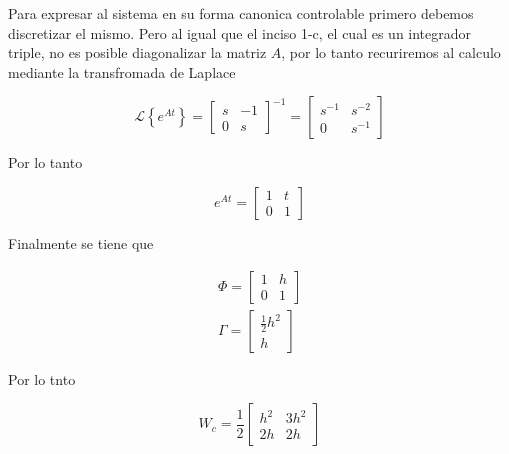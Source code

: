 \documentclass{article}
\newcommand{\laplaceTransform}[1]{\mathcal{L}\left\{ #1 \right\}}
\begin{document}
        Para expresar al sistema en su forma canonica controlable primero debemos discretizar el mismo. Pero
        al igual que el inciso 1-c, el cual es un integrador triple, no es posible diagonalizar la matriz $A$, por lo tanto recuriremos al calculo mediante la transfromada de Laplace 

        \begin{equation}
            \laplaceTransform{e^{At}} = 
                \begin{bmatrix}
                    s & -1 \\ 
                    0 & s 
                \end{bmatrix}^{-1}=
                \begin{bmatrix}
                    s^{-1} & s^{-2} \\ 
                    0 & s^{-1}
                \end{bmatrix}
        \end{equation} 

        Por lo tanto 

        \begin{equation}
            e^{At} = 
                \begin{bmatrix}
                    1 & t \\
                    0 & 1
                \end{bmatrix}
        \end{equation}

        Finalmente se tiene que 

        \begin{equation}
            \begin{array}{c}
                \Phi = 
                    \begin{bmatrix}
                        1 & h \\
                        0 & 1
                    \end{bmatrix} \\ 
                \Gamma = 
                    \begin{bmatrix}
                        \frac{1}{2} h^2 \\ h
                    \end{bmatrix}
            \end{array}
        \end{equation}

        Por lo tnto 

        \begin{equation}
            W_c = \frac{1}{2} 
            \begin{bmatrix}
                h^2 & 3h^2 \\ 
                2h & 2h
            \end{bmatrix}
        \end{equation}
\end{document}
